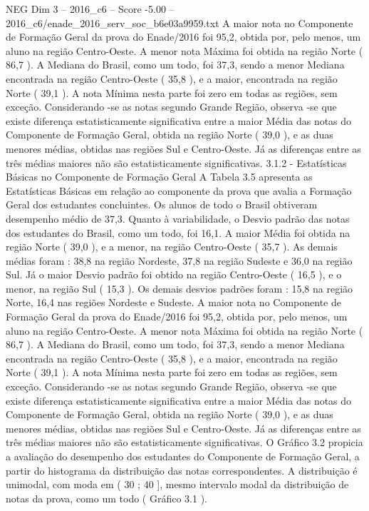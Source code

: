 \begin{textsample}{NEG Dim 3 – 2016\_c6 – Score -5.00 – 2016\_c6/enade\_2016\_serv\_soc\_b6e03a9959.txt}
A maior nota no Componente de Formação Geral da prova do Enade/2016 foi 95,2, obtida por, pelo menos, um aluno na região Centro-Oeste.
A menor nota Máxima foi obtida na região Norte ( 86,7 ).
A Mediana do Brasil, como um todo, foi 37,3, sendo a menor Mediana encontrada na região Centro-Oeste ( 35,8 ), e a maior, encontrada na região Norte ( 39,1 ).
A nota Mínima nesta parte foi zero em todas as regiões, sem exceção.
Considerando -se as notas segundo Grande Região, observa -se que existe diferença estatisticamente significativa entre a maior Média das notas do Componente de Formação Geral, obtida na região Norte ( 39,0 ), e as duas menores médias, obtidas nas regiões Sul e Centro-Oeste.
Já as diferenças entre as três médias maiores não são estatisticamente significativas. 3.1.2 - Estatísticas Básicas no Componente de Formação Geral A Tabela 3.5 apresenta as Estatísticas Básicas em relação ao componente da prova que avalia a Formação Geral dos estudantes concluintes.
Os alunos de todo o Brasil obtiveram desempenho médio de 37,3.
Quanto à variabilidade, o Desvio padrão das notas dos estudantes do Brasil, como um todo, foi 16,1.
A maior Média foi obtida na região Norte ( 39,0 ), e a menor, na região Centro-Oeste ( 35,7 ).
As demais médias foram : 38,8 na região Nordeste, 37,8 na região Sudeste e 36,0 na região Sul.
Já o maior Desvio padrão foi obtido na região Centro-Oeste ( 16,5 ), e o menor, na região Sul ( 15,3 ).
Os demais desvios padrões foram : 15,8 na região Norte, 16,4 nas regiões Nordeste e Sudeste.
A maior nota no Componente de Formação Geral da prova do Enade/2016 foi 95,2, obtida por, pelo menos, um aluno na região Centro-Oeste.
A menor nota Máxima foi obtida na região Norte ( 86,7 ).
A Mediana do Brasil, como um todo, foi 37,3, sendo a menor Mediana encontrada na região Centro-Oeste ( 35,8 ), e a maior, encontrada na região Norte ( 39,1 ).
A nota Mínima nesta parte foi zero em todas as regiões, sem exceção.
Considerando -se as notas segundo Grande Região, observa -se que existe diferença estatisticamente significativa entre a maior Média das notas do Componente de Formação Geral, obtida na região Norte ( 39,0 ), e as duas menores médias, obtidas nas regiões Sul e Centro-Oeste.
Já as diferenças entre as três médias maiores não são estatisticamente significativas.
O Gráfico 3.2 propicia a avaliação do desempenho dos estudantes do Componente de Formação Geral, a partir do histograma da distribuição das notas correspondentes.
A distribuição é unimodal, com moda em ( 30 ; 40 ], mesmo intervalo modal da distribuição de notas da prova, como um todo ( Gráfico 3.1 ).

\end{textsample}
